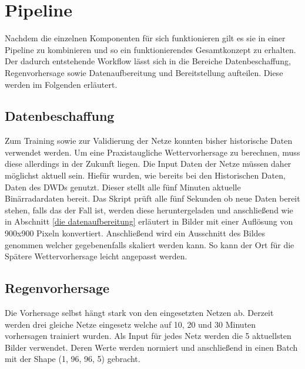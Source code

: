 \section{Pipeline}\label{sec: Pipeline}
Nachdem die einzelnen Komponenten für sich funktionieren gilt es sie in einer Pipeline zu kombinieren und so ein funktionierendes Gesamtkonzept zu erhalten.
Der dadurch entstehende Workflow lässt sich in die Bereiche Datenbeschaffung, Regenvorhersage sowie Datenaufbereitung und Bereitstellung aufteilen.
Diese werden im Folgenden erläutert.

\subsection{Datenbeschaffung}
Zum Training sowie zur Validierung der Netze konnten bisher historische Daten verwendet werden.
Um eine Praxistaugliche Wettervorhersage zu berechnen, muss diese allerdings in der Zukunft liegen.
Die Input Daten der Netze müssen daher möglichst aktuell sein.
Hiefür wurden, wie bereits bei den Historischen Daten, Daten des DWDs genutzt.
Dieser stellt alle fünf Minuten aktuelle Binärradardaten bereit.
Das Skript prüft alle fünf Sekunden ob neue Daten bereit stehen, falls das der Fall ist, werden diese heruntergeladen und anschließend wie in Abschnitt \ref{die datenaufbereitung} erläutert in Bilder mit einer Auflösung von 900x900 Pixeln konvertiert.
Anschließend wird ein Ausschnitt des Bildes genommen welcher gegebenenfalls skaliert werden kann.
So kann der Ort für die Spätere Wettervorhersage leicht angepasst werden.

\subsection{Regenvorhersage}
Die Vorhersage selbst hängt stark von den eingesetzten Netzen ab.
Derzeit werden drei gleiche Netze eingesetz welche auf 10, 20 und 30 Minuten vorhersagen trainiert wurden.
Als Input für jedes Netz werden die 5 aktuellsten Bilder verwendet.
Deren Werte werden normiert und anschließend in einen Batch mit der Shape (1, 96, 96, 5) gebracht.

